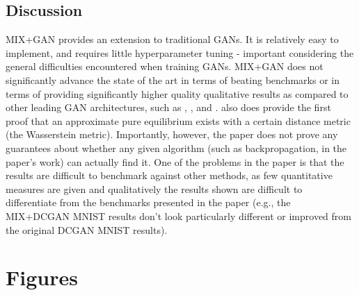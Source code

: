 \documentclass{article}
\begin{document}
\subsection{Discussion}
MIX+GAN provides an extension to traditional GANs. It is relatively easy to implement, and requires little hyperparameter tuning - important considering the general difficulties encountered when training GANs. MIX+GAN does not significantly advance the state of the art in terms of beating benchmarks or in terms of providing significantly higher quality qualitative results as compared to other leading GAN architectures, such as \citet{DBLP:journals/corr/HuangLPHB16}, \citet{Salimans2016}, and \citet{DBLP:journals/corr/OdenaOS16}. \citet{Arora17} also does provide the first proof that an approximate pure equilibrium exists with a certain distance metric (the Wasserstein metric). Importantly, however, the paper does not prove any guarantees about whether any given algorithm (such as backpropagation, in the paper's work) can actually find it. One of the problems in the paper is that the results are difficult to benchmark against other methods, as few quantitative measures are given and qualitatively the results shown are difficult to differentiate from the benchmarks presented in the paper (e.g., the MIX+DCGAN MNIST results don't look particularly different or improved from the original DCGAN MNIST results).



\newpage
\section*{Figures}
    
\end{document}
